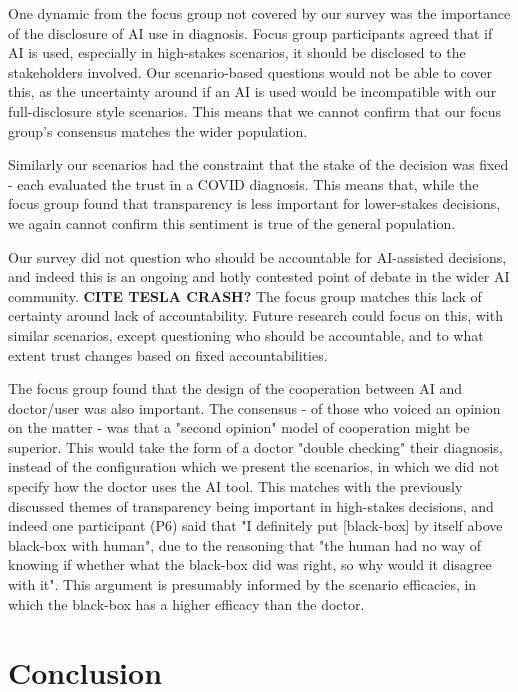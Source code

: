 \documentclass[manuscript,screen,review]{acmart}
\begin{document}
One dynamic from the focus group not covered by our survey was the importance of the disclosure of AI use in diagnosis. Focus group participants agreed that if AI is used, especially in high-stakes scenarios, it should be disclosed to the stakeholders involved. Our scenario-based questions would not be able to cover this, as the uncertainty around if an AI is used would be incompatible with our full-disclosure style scenarios. This means that we cannot confirm that our focus group's consensus matches the wider population.

Similarly our scenarios had the constraint that the stake of the decision was fixed - each evaluated the trust in a COVID diagnosis. This means that, while the focus group found that transparency is less important for lower-stakes decisions, we again cannot confirm this sentiment is true of the general population.

Our survey did not question who should be accountable for AI-assisted decisions, and indeed this is an ongoing and hotly contested point of debate in the wider AI community. \textbf{CITE TESLA CRASH?} The focus group matches this lack of certainty around lack of accountability. Future research could focus on this, with similar scenarios, except questioning who should be accountable, and to what extent trust changes based on fixed accountabilities. 

The focus group found that the design of the cooperation between AI and doctor/user was also important. The consensus - of those who voiced an opinion on the matter - was that a "second opinion" model of cooperation might be superior. This would take the form of a doctor "double checking" their diagnosis, instead of the configuration which we present the scenarios, in which we did not specify how the doctor uses the AI tool. This matches with the previously discussed themes of transparency being important in high-stakes decisions, and indeed one participant (P6) said that "I definitely put [black-box] by itself above black-box with human", due to the reasoning that "the human had no way of knowing if whether what the black-box did was right, so why would it disagree with it". This argument is presumably informed by the scenario efficacies, in which the black-box has a higher efficacy than the doctor.

\newpage
\section{Conclusion}
\end{document}
